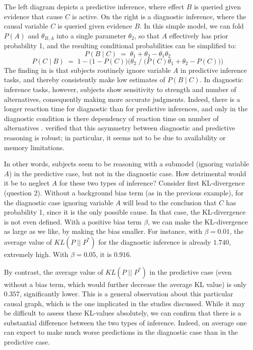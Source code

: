 \documentclass[10pt,letterpaper]{article}
\begin{document}
The left diagram depicts a predictive inference, where effect $B$ is queried given evidence that cause $C$ is active. On the right is a diagnostic inference, where the causal variable $C$ is queried given evidence $B$. In this simple model, we can fold $P(A)$ and $\theta_{B,A}$ into a single parameter $\theta_2$, so that $A$ effectively has prior probability 1, and the resulting conditional probabilities can be simplified to: 
$$P(B\mid C) \;= \; \theta_1 + \theta_2 - \theta_1\theta_2$$
$$P(C \mid B) \;= \; 1- \big(1-P(C)\big)\Big(\theta_2\;/\;\big(P(C)\theta_1 + \theta_2  - P(C)\big)\Big)$$
The finding in \cite{Fernbach2011} is that subjects routinely ignore variable $A$ in predictive inference tasks, and thereby consistently make low estimates of $P(B\mid C)$. In diagnostic inference tasks, however, subjects show sensitivity to strength and number of alternatives, consequently making more accurate judgments. Indeed, there is a longer reaction time for diagnostic than for predictive inferences, and only in the diagnostic condition is there dependency of reaction time on number of alternatives \citep{Fernbach2010}. \cite{Fernbach2013} verified that this asymmetry between diagnostic and predictive reasoning is robust; in particular, it seems not to be due to availability or memory limitations.

In other words, subjects seem to be reasoning with a submodel (ignoring variable $A$) in the predictive case, but not in the diagnostic case. How detrimental would it be to neglect $A$ for these two types of inference? Consider first KL-divergence (question 2). Without a background bias term (as in the previous example), for the diagnostic case ignoring variable $A$ will lead to the conclusion that $C$ has probability 1, since it is the only possible cause. In that case, the KL-divergence is not even defined. With a positive bias term $\beta$, we can make the KL-divergence as large as we like, by making the bias smaller. For instance, with $\beta = 0.01$, the average value of $KL(P\;||\;P^*)$ for the diagnostic inference is already $1.740$, extremely high. With $\beta=0.05$, it is $0.916$.

By contrast, the average value of $KL(P\;||\;P^*)$ in the predictive case (even without a bias term, which would further decrease the average KL value) is only $0.357$, significantly lower.  This is a general observation about this particular causal graph, which is the one implicated in the studies discussed. While it may be difficult to assess these KL-values absolutely, we can confirm that there is a substantial difference between the two types of inference. Indeed, on average one can expect to make much worse predictions in the diagnostic case than in the predictive case.
\end{document}
